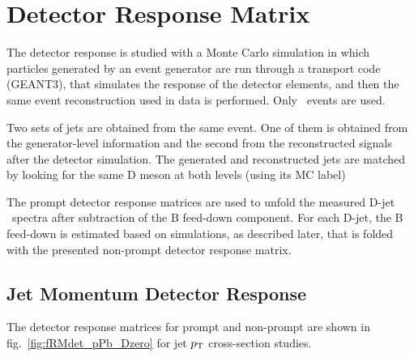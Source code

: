 
\section{ Detector Response Matrix}

The detector response is studied with a Monte Carlo simulation in which particles generated by an event generator are
run through a transport code (GEANT3), that simulates the response of the detector elements, and then the same event reconstruction used in data is performed. Only \ccbar\ events are used.

Two sets of jets are obtained from the same event. One of them is obtained from the generator-level information and the second from the reconstructed signals after the detector simulation. 
The generated and reconstructed jets are matched by looking for the same D meson at both levels (using its MC label)

The prompt detector response matrices are used to unfold the measured D-jet \pt\ spectra after subtraction of the B feed-down component. 
For each D-jet, the B feed-down is estimated based on simulations, as described later, that is folded with the presented non-prompt detector response matrix.

\subsection{Jet Momentum Detector Response}
The detector response matrices for prompt and non-prompt are shown in fig.~\ref{fig:fRMdet_pPb_Dzero} for jet $p_{\text T}$ cross-section studies.

